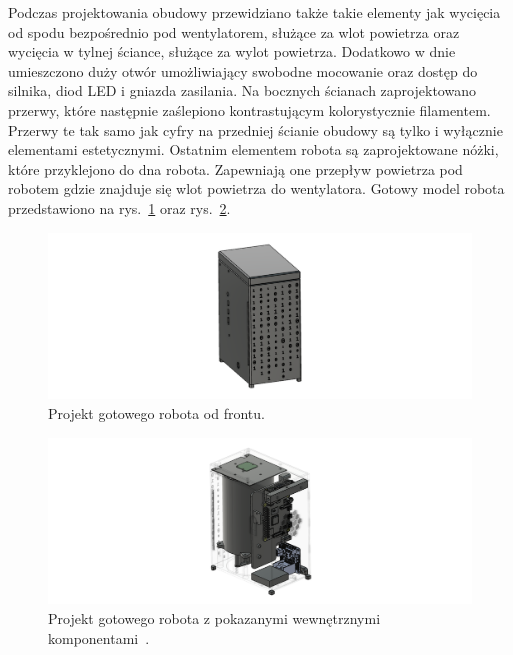 Podczas projektowania obudowy przewidziano także takie elementy jak wycięcia od spodu bezpośrednio pod wentylatorem, służące za wlot powietrza
oraz wycięcia w tylnej ściance, służące za wylot powietrza. Dodatkowo w dnie umieszczono duży otwór umożliwiający swobodne mocowanie oraz dostęp do
silnika, diod LED i gniazda zasilania. Na bocznych ścianach zaprojektowano przerwy, które następnie zaślepiono kontrastującym kolorystycznie filamentem.
Przerwy te tak samo jak cyfry na przedniej ścianie obudowy są tylko i wyłącznie elementami estetycznymi. Ostatnim elementem robota są zaprojektowane nóżki,
które przyklejono do dna robota. Zapewniają one przepływ powietrza pod robotem gdzie znajduje się wlot powietrza do wentylatora. Gotowy model robota przedstawiono
na rys.~\ref{fig:gotowy} oraz rys.~\ref{fig:srodek}.

\begin{figure}[H]
    \centering
    \includegraphics[width=0.95\linewidth]{chapters/03-praca-wlasna/figures/gotowy2}
    \caption{\label{fig:gotowy}Projekt gotowego robota od frontu.}
\end{figure}

\begin{figure}[H]
    \centering
    \includegraphics[width=0.95\linewidth]{chapters/03-praca-wlasna/figures/gotowy w srodku}
    \caption{\label{fig:srodek}Projekt gotowego robota z pokazanymi wewnętrznymi komponentami~\cite{malina3d, L298n3d, malina_cam}.}
\end{figure}